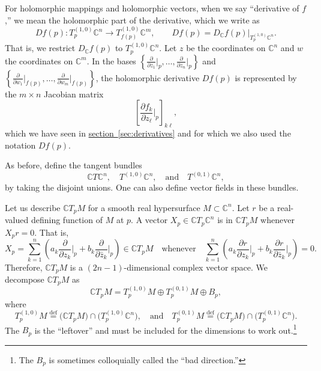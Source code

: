 \documentclass[12pt,openany]{book}
\newcommand{\C}{{\mathbb{C}}}
\theoremstyle{plain}
\theoremstyle{remark}
\theoremstyle{definition}
\theoremstyle{exercise}
\theoremstyle{example}
\newcommand{\sectionref}[1]{\hyperref[#1]{section~\ref*{#1}}}
\begin{document}
For holomorphic mappings and holomorphic vectors,
when we say ``derivative of $f$,'' we mean the holomorphic part of the
derivative, which we write as
%
\begin{equation*}
D f(p) \colon T_p^{(1,0)} \C^n \to T_{f(p)}^{(1,0)} \C^m ,
\qquad
D f(p) = D_{\C} f(p) \big|_{T_p^{(1,0)} \C^n} .
\end{equation*}
That is, we restrict $D_\C f(p)$ to $T_p^{(1,0)} \C^n$.
Let $z$ be the coordinates on $\C^n$ and
$w$ the coordinates on $\C^m$.
In the bases
$\left\{ \frac{\partial}{\partial z_1} \big|_p,\ldots,
\frac{\partial}{\partial z_n} \big|_p \right\}$
and
$\left\{ \frac{\partial}{\partial w_1} \big|_{f(p)},\ldots,
\frac{\partial}{\partial w_m} \big|_{f(p)} \right\}$,
the holomorphic derivative $Df(p)$
is represented by the $m \times n$ Jacobian matrix
\begin{equation*}
\left[
\frac{\partial f_k}{\partial z_\ell} \Big|_p
\right]_{k\ell} ,
\end{equation*}
which we have seen in \sectionref{sec:derivatives}
and for which we also used the notation $Df(p)$.

As before, define the tangent bundles
\begin{equation*}
\C T\C^n,
\quad
T^{(1,0)} \C^n,
\quad \text{and} \quad
T^{(0,1)} \C^n ,
\end{equation*}
by taking the disjoint unions.
One can also define vector fields in these bundles.

Let us describe $\C T_pM$
for a smooth real hypersurface $M \subset \C^n$.
Let $r$ be a real-valued defining function of
$M$ at $p$.  A vector
$X_p \in \C T_p\C^n$ is in
$\C T_pM$ whenever $X_p r = 0$.  That is,
\begin{equation*}
X_p = \sum_{k=1}^n
\left(
a_k
\frac{\partial}{\partial z_k} \Big|_p
+
b_k
\frac{\partial}{\partial \bar{z}_k} \Big|_p
\right) \in \C T_p M
\quad
\text{whenever}
\quad
 \sum_{k=1}^n
\left(
a_k
\frac{\partial r}{\partial z_k} \Big|_p
+
b_k
\frac{\partial r}{\partial \bar{z}_k} \Big|_p
\right)
= 0 .
\end{equation*}
Therefore, $\C T_p M$ is a $(2n-1)$-dimensional complex vector space.
We decompose $\C T_p M$ as
\begin{equation*}
\C T_pM =
T_p^{(1,0)} M \oplus T_p^{(0,1)} M \oplus B_p ,
\end{equation*}
where
\begin{equation*}
T_p^{(1,0)} M \overset{\text{def}}{=} \bigl( \C T_pM \bigr) \cap
\bigl( T_p^{(1,0)} \C^n \bigr),  \quad \text{and}
\quad
T_p^{(0,1)} M \overset{\text{def}}{=} \bigl( \C T_pM \bigr) \cap
\bigl( T_p^{(0,1)} \C^n \bigr) .
\end{equation*}
The $B_p$ is the ``leftover'' and must
be included for the dimensions to work out.\footnote{%
The $B_p$ is sometimes colloquially called the ``bad direction.''}
\end{document}
